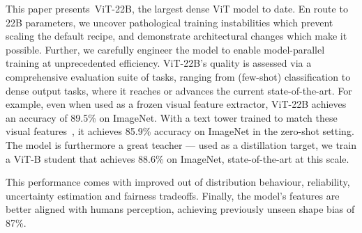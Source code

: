 \documentclass{article}
\newcommand{\chonk}{\mbox{ViT-22B}\xspace}
\begin{document}
This paper presents~\chonk{}, the largest dense ViT model to date. En route to 22B parameters, we uncover pathological training instabilities which prevent scaling the default recipe, and demonstrate architectural changes which make it possible. Further, we carefully engineer the model to enable model-parallel training at unprecedented efficiency.
\chonk{}'s quality is assessed via a comprehensive evaluation suite of tasks, ranging from (few-shot) classification to dense output tasks, where it reaches or advances the current state-of-the-art.
For example, even when used as a frozen visual feature extractor, \chonk achieves an accuracy of 89.5\% on ImageNet.
With a text tower trained to match these visual features~\citep{lit}, it achieves 85.9\% accuracy on ImageNet in the zero-shot setting.
The model is furthermore a great teacher --- used as a distillation target, we train a ViT-B student that achieves 88.6\% on ImageNet, state-of-the-art at this scale.

This performance comes with improved out of distribution behaviour, reliability, uncertainty estimation and fairness tradeoffs.
Finally, the model's features are better aligned with humans perception, achieving previously unseen shape bias of 87\%.

\end{document}
